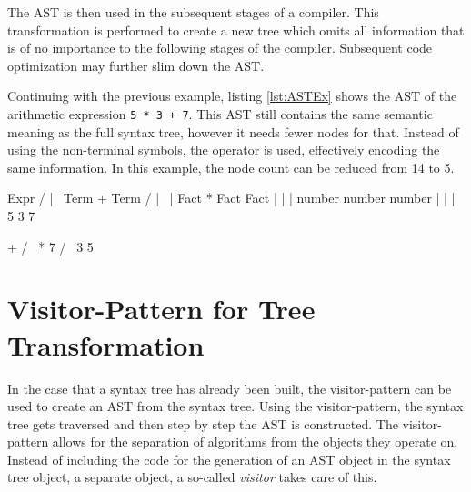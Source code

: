 The AST is then used in the subsequent stages of a compiler. This transformation is performed to create a new tree which omits all information that is of no importance to the following stages of the compiler. Subsequent code optimization may further slim down the AST. 

Continuing with the previous example, listing \ref{lst:ASTEx} shows the AST of the arithmetic expression \texttt{5 * 3 + 7}. This AST still contains the same semantic meaning as the full syntax tree, however it needs fewer nodes for that. Instead of using the non-terminal symbols, the operator is used, effectively encoding the same information. In this example, the node count can be reduced from 14 to 5.

\begin{GenericCode}[float,numbers=none,caption=Syntax tree of the arithmetic expression \texttt{5 * 3 + 7} based on the grammar in listing \ref{lst:Coco2ATG}., label=lst:SyntaxTreeEx]
                                       Expr   
                                   /    |    \
                                Term    +    Term
                              /   |   \        |    
                           Fact   *   Fact    Fact  
                            |          |       |
                          number     number  number
                            |          |       |
                            5          3       7
\end{GenericCode}

\begin{GenericCode}[float,numbers=none,caption=Abstract syntax tree of the arithmetic expression \texttt{5 * 3 + 7}., label=lst:ASTEx]
                                      +
                                    /   \
                                   *     7
                                 /   \
                                3     5
\end{GenericCode}

\section{Visitor-Pattern for Tree Transformation}

In the case that a syntax tree has already been built, the visitor-pattern can be used to create an AST from the syntax tree. Using the visitor-pattern, the syntax tree gets traversed and then step by step the AST is constructed. The visitor-pattern allows for the separation of algorithms from the objects they operate on. Instead of including the code for the generation of an AST object in the syntax tree object, a separate object, a so-called \textit{visitor} takes care of this. 

